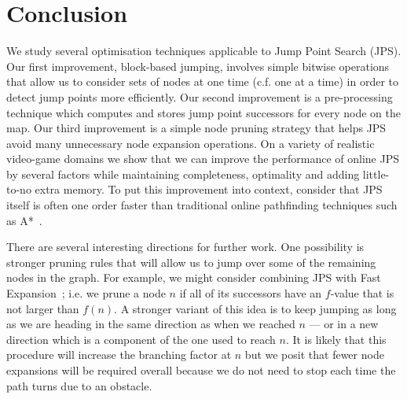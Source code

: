 \section{Conclusion}
\label{sec::conclusion}
We study several optimisation techniques applicable to Jump Point Search (JPS).
Our first improvement, block-based jumping, involves simple bitwise
operations that allow us to consider sets of nodes at one time (c.f. one
at a time) in order to detect jump points more efficiently. Our second
improvement is a pre-processing technique which computes and stores jump point
successors for every node on the map. Our third improvement is a simple node
pruning strategy that helps JPS avoid many unnecessary node expansion operations.
On a variety of realistic video-game domains we show that we can improve the
performance of online JPS by several factors while maintaining completeness,
optimality and adding little-to-no extra memory. 
To put this
improvement into context, consider that JPS itself is often one order faster
than traditional online pathfinding techniques such as A{*}~\cite{harabor11b}.
%

There are several interesting directions for further work. One possibility is
stronger pruning rules that will allow us to jump over some of the remaining
nodes in the graph. For example, we might consider combining JPS with Fast
Expansion~\cite{sun09}; i.e. we prune a node $n$ if all of its successors have
an $f$-value that is not larger than $f(n)$. A stronger variant of this idea
is to keep jumping as long as we are heading in the same direction as when we
reached $n$ --- or in a new direction which is a component of the one used to
reach $n$. It is likely that this procedure will increase the branching factor
at $n$ but we posit that fewer node expansions will be required overall because
we do not need to stop each time the path turns due to an obstacle.

